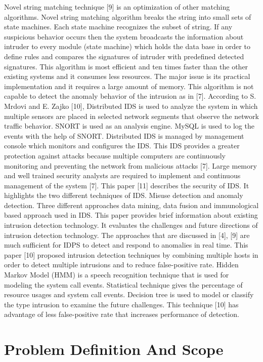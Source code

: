 \documentclass[12pt,a4paper]{report}
\begin{document}
Novel string matching technique [9] is an optimization of other matching algorithms. Novel string matching algorithm breaks the string into small sets of state machines. Each state machine recognizes the subset of string. If any suspicious behavior occurs then the system broadcasts the information about intruder to every module (state machine) which holds the data base in order to define rules and compares the signatures of intruder with predefined detected signatures. This algorithm is most efficient and ten times faster than the other existing systems and it consumes less resources. The major issue is its practical implementation and it requires a large amount of memory. This algorithm is not capable to detect the anomaly behavior of the intrusion as in [7].
According to S. Mrdovi and E. Zajko [10], Distributed IDS is used to analyze the system in which multiple sensors are placed in selected network segments that observe the network traffic behavior. SNORT is used as an analysis engine. MySQL is used to log the events with the help of SNORT. Distributed IDS is managed by management console which monitors and configures the IDS. This IDS provides a greater protection against attacks because multiple computers are continuously monitoring and preventing the network from malicious attacks [7]. Large memory and well trained security analysts are required to implement and continuous management of the system [7].
This paper [11] describes the security of IDS. It highlights the two different techniques of IDS. Misuse detection and anomaly detection. Three different approaches data mining, data fusion and immunological based approach used in IDS. This paper provides brief information about existing intrusion detection technology. It evaluates the challenges and future directions of intrusion detection technology. The approaches that are discussed in [4], [9] are much sufficient for IDPS to detect and respond to anomalies in real time. This paper [10] proposed intrusion detection techniques by combining multiple hosts in order to detect multiple intrusions and to reduce false-positive rate. Hidden Markov Model (HMM) is a speech recognition technique that is used for modeling the system call events. Statistical technique gives the percentage of resource usages and system call events. Decision tree is used to model or classify the type intrusion to examine the future challenges. This technique [10] has advantage of less false-positive rate that increases performance of detection. 
\newpage
\chapter{Problem Definition And Scope}
\newpage
\end{document}
